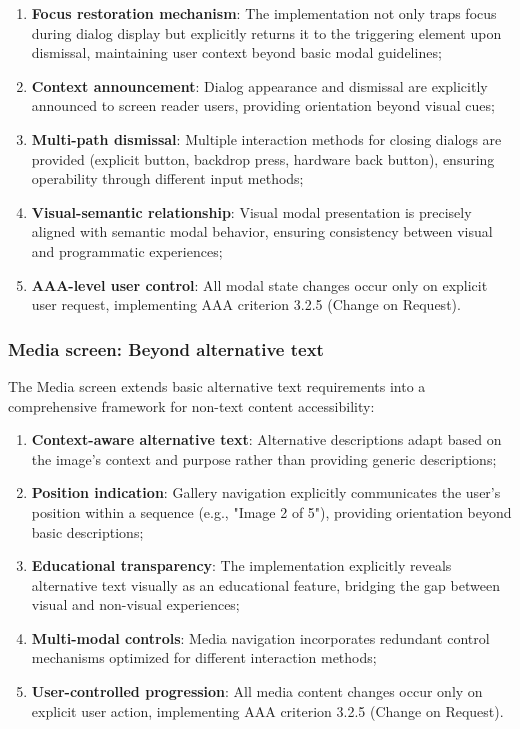\begin{enumerate}
    \item \textbf{Focus restoration mechanism}: The implementation not only traps focus during dialog display but explicitly returns it to the triggering element upon dismissal, maintaining user context beyond basic modal guidelines;
    
    \item \textbf{Context announcement}: Dialog appearance and dismissal are explicitly announced to screen reader users, providing orientation beyond visual cues;
    
    \item \textbf{Multi-path dismissal}: Multiple interaction methods for closing dialogs are provided (explicit button, backdrop press, hardware back button), ensuring operability through different input methods;
    
    \item \textbf{Visual-semantic relationship}: Visual modal presentation is precisely aligned with semantic modal behavior, ensuring consistency between visual and programmatic experiences;
    
    \item \textbf{AAA-level user control}: All modal state changes occur only on explicit user request, implementing AAA criterion 3.2.5 (Change on Request).
\end{enumerate}

\subsubsection{Media screen: Beyond alternative text}
\label{subsubsec:media-beyond-wcag}

The Media screen extends basic alternative text requirements into a comprehensive framework for non-text content accessibility:

\begin{enumerate}
    \item \textbf{Context-aware alternative text}: Alternative descriptions adapt based on the image's context and purpose rather than providing generic descriptions;
    
    \item \textbf{Position indication}: Gallery navigation explicitly communicates the user's position within a sequence (e.g., "Image 2 of 5"), providing orientation beyond basic descriptions;
    
    \item \textbf{Educational transparency}: The implementation explicitly reveals alternative text visually as an educational feature, bridging the gap between visual and non-visual experiences;
    
    \item \textbf{Multi-modal controls}: Media navigation incorporates redundant control mechanisms optimized for different interaction methods;
    
    \item \textbf{User-controlled progression}: All media content changes occur only on explicit user action, implementing AAA criterion 3.2.5 (Change on Request).
\end{enumerate}

